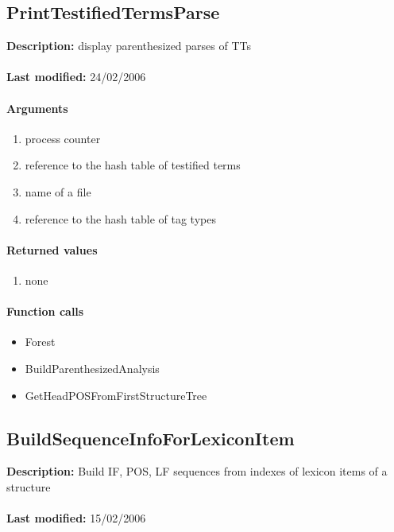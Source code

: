 \subsection{PrintTestifiedTermsParse}
\textbf{Description:} display parenthesized parses of TTs\\
\\\textbf{Last modified:} 24/02/2006

\paragraph{Arguments}
\begin{enumerate}
\item process counter
\item reference to the hash table of testified terms
\item name of a file
\item reference to the hash table of tag types
\end{enumerate}

\paragraph{Returned values}
\begin{enumerate}
\item none
\end{enumerate}

\paragraph{Function calls}
\begin{itemize}
\item Forest
\item BuildParenthesizedAnalysis
\item GetHeadPOSFromFirstStructureTree
\end{itemize}

\subsection{BuildSequenceInfoForLexiconItem}
\textbf{Description:} Build IF, POS, LF sequences from indexes of lexicon items of a structure\\
\\\textbf{Last modified:} 15/02/2006

